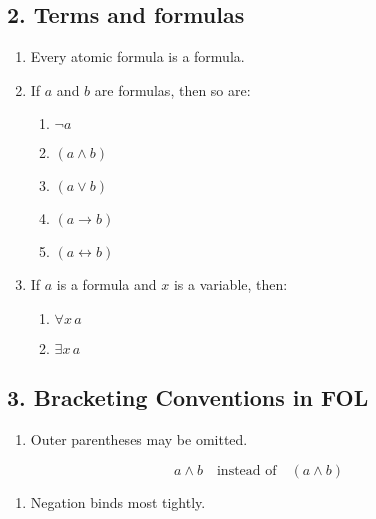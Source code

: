 \subsection{2. Terms and formulas}\label{terms-and-formulas}

\begin{enumerate}
\def\labelenumi{\arabic{enumi}.}
\tightlist
\item
  Every atomic formula is a formula.
\item
  If \(a\) and \(b\) are formulas, then so are:

  \begin{enumerate}
  \def\labelenumii{\arabic{enumii}.}
  \tightlist
  \item
    \(\lnot a\)
  \item
    \((a \land b)\)
  \item
    \((a \lor b)\)
  \item
    \((a \to b)\)
  \item
    \((a \leftrightarrow b)\)
  \end{enumerate}
\item
  If \(a\) is a formula and \(x\) is a variable, then:

  \begin{enumerate}
  \def\labelenumii{\arabic{enumii}.}
  \tightlist
  \item
    \(\forall x \, a\)
  \item
    \(\exists x \, a\)
  \end{enumerate}
\end{enumerate}

\subsection{3. Bracketing Conventions in
FOL}\label{bracketing-conventions-in-fol}

\begin{enumerate}
\def\labelenumi{\arabic{enumi}.}
\tightlist
\item
  Outer parentheses may be omitted.
\end{enumerate}

\[
  a \land b \quad \text{instead of} \quad (a \land b)
  \]

\begin{enumerate}
\def\labelenumi{\arabic{enumi}.}
\setcounter{enumi}{1}
\tightlist
\item
  Negation binds most tightly.
\end{enumerate}

